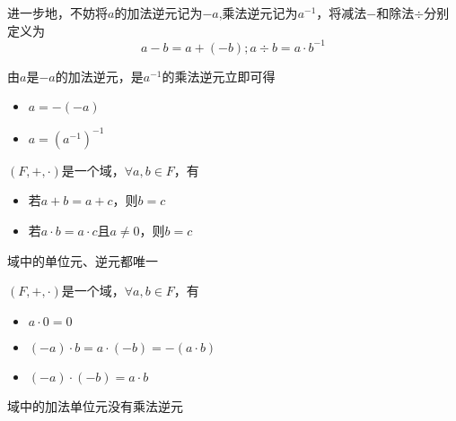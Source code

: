 进一步地，不妨将$a$的加法逆元记为$-a$,乘法逆元记为$a^{-1}$，将减法$-$和除法$\div$分别定义为
\[a-b=a+(-b);a \div b = a \cdot b^{-1}\]
\begin{theorem}
    由$a$是$-a$的加法逆元，是$a^{-1}$的乘法逆元立即可得
    \begin{itemize}
        \item $a=-(-a)$
        \item $a=(a^{-1})^{-1}$
    \end{itemize}
\end{theorem}
\begin{theorem}[消去律]
    $(F,+,\cdot)$是一个域，$\forall a,b \in F$，有
    \begin{itemize}
        \item 若$a+b=a+c$，则$b=c$
        \item 若$a \cdot b=a \cdot c$且$a \neq 0$，则$b=c$
    \end{itemize}
\end{theorem}
\begin{corollary}
    域中的单位元、逆元都唯一
\end{corollary}
\begin{theorem}
    $(F,+,\cdot)$是一个域，$\forall a,b \in F$，有
    \begin{itemize}
        \item $a \cdot 0 = 0$
        \item $(-a) \cdot b = a \cdot (-b) = -(a \cdot b)$
        \item $(-a) \cdot (-b) = a \cdot b$
    \end{itemize}
\end{theorem}
\begin{corollary}
    域中的加法单位元没有乘法逆元
\end{corollary}